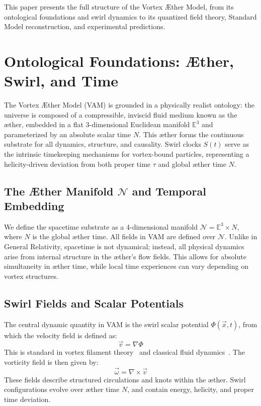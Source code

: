 \documentclass[12pt]{article}
\begin{document}
    This paper presents the full structure of the Vortex \AE ther Model, from its ontological foundations and swirl dynamics to its quantized field theory, Standard Model reconstruction, and experimental predictions.

\section{Ontological Foundations: Æther, Swirl, and Time}

    The Vortex \AE ther Model (VAM) is grounded in a physically realist ontology: the universe is composed of a compressible, inviscid fluid medium known as the \ae ther, embedded in a flat 3-dimensional Euclidean manifold $\mathbb{E}^3$ and parameterized by an absolute scalar time $N$. This æther forms the continuous substrate for all dynamics, structure, and causality. Swirl clocks $S(t)$ serve as the intrinsic timekeeping mechanisms for vortex-bound particles, representing a helicity-driven deviation from both proper time $\tau$ and global æther time $N$.


    \subsection{The Æther Manifold $\mathcal{N}$ and Temporal Embedding}

    We define the spacetime substrate as a 4-dimensional manifold $\mathcal{N} = \mathbb{E}^3 \times N$, where $N$ is the global æther time. All fields in VAM are defined over $\mathcal{N}$. Unlike in General Relativity, spacetime is not dynamical; instead, all physical dynamics arise from internal structure in the æther's flow fields. This allows for absolute simultaneity in æther time, while local time experiences can vary depending on vortex structures.

    \subsection{Swirl Fields and Scalar Potentials}

    The central dynamic quantity in VAM is the swirl scalar potential $\Phi(\vec{x},t)$, from which the velocity field is defined as:
    \begin{equation}
        \vec{v} = \nabla \Phi
        \label{eq:velocity_from_potential}
    \end{equation}
    This is standard in vortex filament theory~\cite{saffman1992vortex} and classical fluid dynamics~\cite{batchelor2000introduction}.
    The vorticity field is then given by:
    \begin{equation}
        \vec{\omega} = \nabla \times \vec{v}
        \label{eq:vorticity_definition}
    \end{equation}
    These fields describe structured circulations and knots within the æther. Swirl configurations evolve over æther time $N$, and contain energy, helicity, and proper time deviation.
\end{document}
